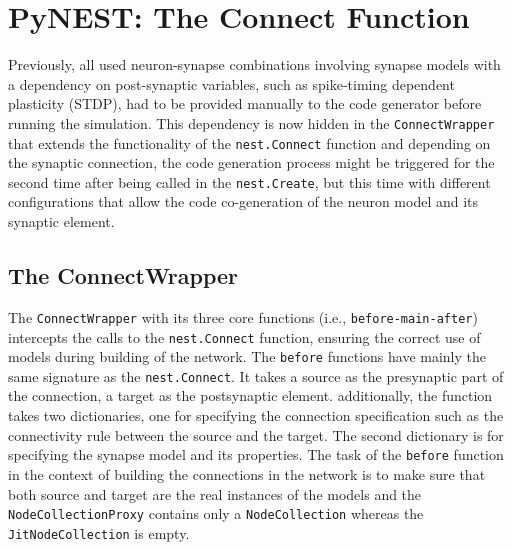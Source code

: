 \section{PyNEST: The Connect Function}

Previously, all used neuron-synapse combinations involving synapse models with a dependency on post-synaptic variables, such as spike-timing dependent plasticity (STDP), had to be provided manually to the code generator before running the simulation.  This dependency is now hidden in the \texttt{ConnectWrapper} that extends the functionality of the \texttt{nest.Connect} function and depending on the synaptic connection, the code generation process might be triggered  for the second time after being called in the \texttt{nest.Create}, but this time with different  configurations that allow the code co-generation of the neuron model and its synaptic element.

\subsection{The ConnectWrapper}

The \texttt{ConnectWrapper} with its three core functions (i.e., \texttt{before-main-after}) intercepts the calls to the \texttt{nest.Connect} function, ensuring the correct use of models during building of the network. The \texttt{before} functions have mainly the same signature as the \texttt{nest.Connect}. It takes a source as the presynaptic part of the connection, a target as the postsynaptic element. additionally, the function takes two dictionaries, one for specifying the connection specification such as the connectivity rule between the source and the target. The second dictionary is for specifying the synapse model and its properties. The task of the \texttt{before} function in the context of building the connections in the network is to make sure that both source and target are the real instances of the models and the \texttt{NodeCollectionProxy} contains only a \texttt{NodeCollection} whereas the \texttt{JitNodeCollection} is empty. 

